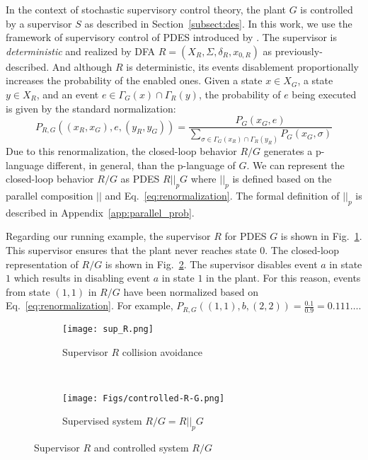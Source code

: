 In the context of stochastic supervisory control theory, the plant $G$ is controlled by a supervisor $S$ as described in Section~\ref{subsect:des}.
In this work, we use the framework of supervisory control of PDES introduced by \citep{Kumar:2001}.
The supervisor is \emph{deterministic} and realized by DFA $R = (X_R,\Sigma,\allowbreak \delta_R,x_{0,R})$ as previously-described.
And although $R$ is deterministic, its events disablement proportionally increases the probability of the enabled ones.
Given a state $x\in X_G$, a state $y \in X_R$, and an event $e \in \Gamma_G(x)\cap\Gamma_R(y)$, the probability of $e$ being executed is given by the standard normalization:
\begin{equation}\label{eq:renormalization}
P_{R,G}((x_R,x_G),e,(y_R,y_G)) = \frac{P_G(x_G,e)}{\sum_{\sigma\in\Gamma_G(x_R)\cap\Gamma_R(y_R)}P_G(x_G,\sigma)}
\end{equation}
Due to this renormalization, the closed-loop behavior $R/G$ generates a p-language different, in general, than the p-language of $G$.
We can represent the closed-loop behavior $R/G$ as PDES $R||_p G$ where $||_p$ is defined based on the parallel composition $||$ and Eq.~\ref{eq:renormalization}.
The formal definition of $||_p$ is described in Appendix~\ref{app:parallel_prob}.



\begin{example}
Regarding our running example, the supervisor $R$ for PDES $G$ is shown in Fig.~\ref{fig:sup_R}.
This supervisor ensures that the plant never reaches state $0$.
The closed-loop representation of $R/G$ is shown in Fig.~\ref{fig:M_n}.
The supervisor disables event $a$ in state $1$ which results in disabling event $a$ in state $1$ in the plant.
For this reason, events from state $(1,1)$ in $R/G$ have been normalized based on Eq.~\ref{eq:renormalization}.
For example, $P_{R,G}((1,1),b,(2,2)) = \frac{0.1}{0.9}= 0.111\dots$.
\end{example}
\begin{figure}[thpb]
\begin{subfigure}[t]{0.45\columnwidth}
\centering
\texttt{[image: sup\_R.png]}
\caption{Supervisor $R$ collision avoidance}
\label{fig:sup_R}
\end{subfigure}
\ 
\begin{subfigure}[t]{0.45\columnwidth}
\centering
\texttt{[image: Figs/controlled-R-G.png]}
\caption{Supervised system $R/G=R||_pG$}
\label{fig:M_n}
\end{subfigure}
\caption{Supervisor $R$ and controlled system $R/G$}
\label{fig:supervisor-controlled}
\vspace{-2em}
\end{figure}

